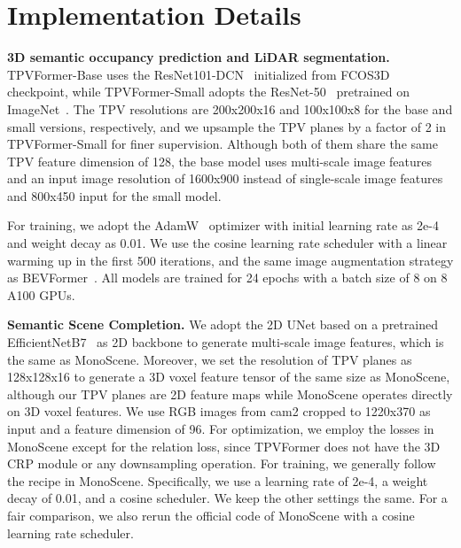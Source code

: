 \documentclass[10pt,twocolumn,letterpaper]{article}
\begin{document}
\section{Implementation Details} \label{app:implement}
\textbf{3D semantic occupancy prediction and LiDAR segmentation.}
TPVFormer-Base uses the ResNet101-DCN~\cite{resnet,dcn} initialized from FCOS3D~\cite{fcos3d} checkpoint, while TPVFormer-Small adopts the ResNet-50~\cite{resnet} pretrained on ImageNet~\cite{deng2009imagenet}.
The TPV resolutions are 200x200x16 and 100x100x8 for the base and small versions, respectively, and we upsample the TPV planes by a factor of 2 in TPVFormer-Small for finer supervision.
Although both of them share the same TPV feature dimension of 128, the base model uses multi-scale image features and an input image resolution of 1600x900 instead of single-scale image features and 800x450 input for the small model.

For training, we adopt the AdamW~\cite{adamw} optimizer with initial learning rate as 2e-4 and weight decay as 0.01.
We use the cosine learning rate scheduler with a linear warming up in the first 500 iterations, and the same image augmentation strategy as BEVFormer~\cite{bevformer}.
All models are trained for 24 epochs with a batch size of 8 on 8 A100 GPUs.

\textbf{Semantic Scene Completion.}
We adopt the 2D UNet based on a pretrained EfficientNetB7~\cite{efficientnet} as 2D backbone to generate multi-scale image features, which is the same as MonoScene.
Moreover, we set the resolution of TPV planes as 128x128x16 to generate a 3D voxel feature tensor of the same size as MonoScene, although our TPV planes are 2D feature maps while MonoScene operates directly on 3D voxel features.
We use RGB images from cam2 cropped to 1220x370 as input and a feature dimension of 96.
For optimization, we employ the losses in MonoScene except for the relation loss, since TPVFormer does not have the 3D CRP module or any downsampling operation.
For training, we generally follow the recipe in MonoScene.
Specifically, we use a learning rate of 2e-4, a weight decay of 0.01, and a cosine scheduler.
We keep the other settings the same.
For a fair comparison, we also rerun the official code of MonoScene with a cosine learning rate scheduler.
\end{document}
